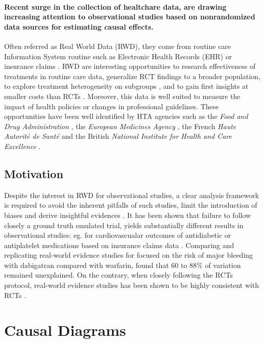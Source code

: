 \documentclass{article}
\begin{document}
\paragraph{Recent surge in the collection of healtchare data, are drawing
  increasing attention to observational studies based on nonrandomized data
  sources for estimating causal effects.} Often referred as Real World Data
(RWD), they come from routine care Information System routine such as
Electronic Health Records (EHR) or insurance claims \citep{wang2023emulation}.
RWD are interesting opportunities to research effectiveness of treatments in
routine care data, generalize RCT findings to a broader population, to explore
treatment heterogeneity on subgroups \citep{mant1999can, desai2021broadening},
and to gain first insights at smaller costs than RCTs
\citep{black1996we,bosdriesz2020evidence}. Moreover, this data is well suited
to measure the impact of health policies or changes in professional
guidelines. These opportunities have been well identified by HTA agencies such
as the \textit{Food and Drug Administration}
\citep{desai2021broadening,fda_real-world_2021}, the \textit{European
  Medicines Agency} \citep{flynn_marketing_2022}, the French \textit{Haute
  Autorité de Santé} \citep{vanier2023rapid} and the British \textit{National
Institute for
  Health and Care Excellence} \citep{kent_nice_2022}.

\subsection{Motivation}

Despite the interest in RWD for observational studies, a clear analysis
framework is required to avoid the inherent pitfalls of such studies, limit the
introduction of biases and derive insightful evidences \citep{hernan2019second,
  wang2023emulation}. It has been shown that failure to follow closely a ground
truth emulated trial,
yields substantially different results in observational studies: eg. for
cardiovascualar outcomes of antidiabetic or antiplatelet medications based on
insurance claims data \citep{schneeweiss2021conducting}. Comparing and
replicating real-world evidence studies for focused on the risk of major
bleeding
with dabigatran compared with warfarin, \cite{wang2022understanding} found that
60 to 88\% of variation remained unexplained. On the contrary, when closely
following the RCTs protocol, real-world evidence studies has been shown to be
highly consistent with RCTs \citep{wang2023emulation}.
\clearpage

\printbibliography

\appendix

\clearpage

\section{Causal Diagrams}
\end{document}
